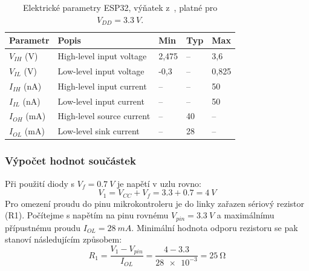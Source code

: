         \begin{table}[h]
            \centering
            \caption{Elektrické parametry ESP32, výňatek z~\cite{esp32-wroom-32e-datasheet}, platné pro \(V_{DD} =\qty{3,3}{V}\).}
            \label{tab:esp32-elektricke-parametry}
            \begin{tabular}{|l|l|l|l|l|}
            \hline
            \textbf{Parametr} & \textbf{Popis} & \textbf{Min} & \textbf{Typ} & \textbf{Max} \\ \hline
            \(V_{IH}\) (V)   & High-level input voltage   & 2,475  & --  & 3,6          \\ \hline
            \(V_{IL}\) (V)   & Low-level input voltage    & -0,3 & --   & 0,825   \\ \hline
            \(I_{IH}\) (nA)  & High-level input current   & --   & --   & 50           \\ \hline
            \(I_{IL}\) (nA)  & Low-level input current    & --   & --   & 50           \\ \hline
            \(I_{OH}\) (mA)  & High-level source current  & --   & 40   & --           \\ \hline
            \(I_{OL}\) (mA)  & Low-level sink current     & --   & 28   & --           \\ \hline
            \end{tabular}
        \end{table}

        \subsubsection{Výpočet hodnot součástek}
            Při použití diody s \(V_{f} =\qty{0.7}{V}\) je napětí v uzlu  rovno:
            \begin{equation}
                V_{1} =V_{CC} +V_{f} = \num{3,3}+\num{0,7}=\qty{4}{V}
            \end{equation}
            Pro omezení proudu do pinu mikrokontroleru je do linky zařazen sériový rezistor (R1). Počítejme s napětím na pinu rovnému \(V_{pin} =\qty{3.3}{V}\) a maximálnímu přípustnému proudu \(I_{OL} =\qty{28}{mA}\). Minimální hodnota odporu rezistoru se pak stanoví následujícím způsobem:
            \begin{equation}
                R_{1} =\frac{V_{1}- V_{pin}}{I_{OL} }=\frac{\num{4}-\num{3.3}}{\num{28e-3}}=\qty{25}{\ohm}
            \end{equation}

